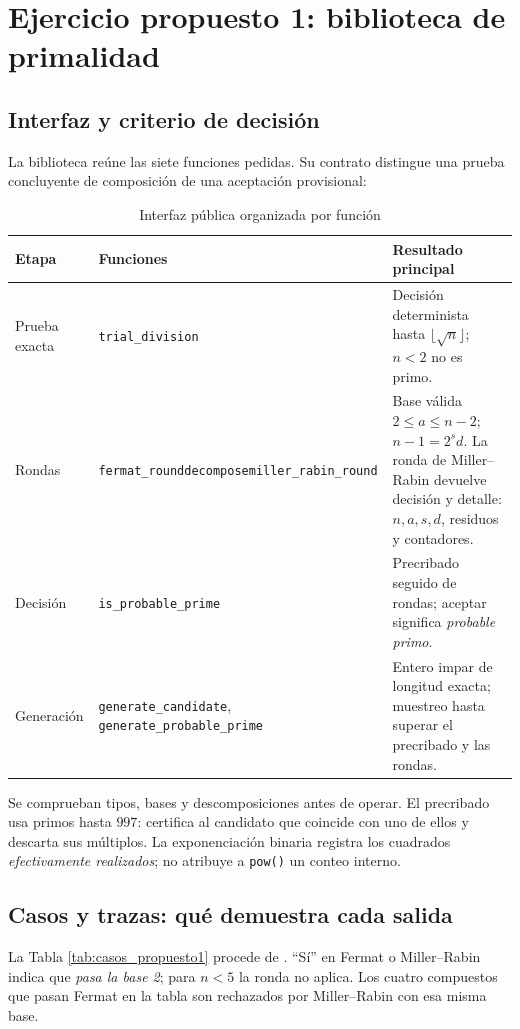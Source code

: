 \section{Ejercicio propuesto 1: biblioteca de primalidad}

\subsection{Interfaz y criterio de decisión}
La biblioteca  reúne las siete funciones pedidas. Su contrato distingue una prueba concluyente de composición de una aceptación provisional:
\begin{table}[H]\centering\small
\caption{Interfaz pública organizada por función}\label{tab:interfaz}
\begin{tabularx}{\textwidth}{@{}p{}>{\raggedright\arraybackslash}p{}X@{}}\toprule
Etapa & Funciones & Resultado principal \\ \midrule
Prueba exacta & \texttt{trial\_division} & Decisión determinista hasta $\lfloor\sqrt n\rfloor$; $n<2$ no es primo. \\
Rondas & \texttt{fermat\_round}\newline\texttt{decompose}\newline\texttt{miller\_rabin\_round} & Base válida $2\le a\le n-2$; $n-1=2^sd$. La ronda de Miller--Rabin devuelve decisión y detalle: $n,a,s,d$, residuos y contadores. \\
Decisión & \texttt{is\_probable\_prime} & Precribado seguido de rondas; aceptar significa \emph{probable primo}. \\
Generación & \texttt{generate\_candidate}, \texttt{generate\_probable\_prime} & Entero impar de longitud exacta; muestreo hasta superar el precribado y las rondas. \\ \bottomrule
\end{tabularx}\end{table}

Se comprueban tipos, bases y descomposiciones antes de operar. El precribado usa primos hasta $997$: certifica al candidato que coincide con uno de ellos y descarta sus múltiplos. La exponenciación binaria registra los cuadrados \emph{efectivamente realizados}; no atribuye a \texttt{pow()} un conteo interno.

\subsection{Casos y trazas: qué demuestra cada salida}
La Tabla \ref{tab:casos_propuesto1} procede de . ``Sí'' en Fermat o Miller--Rabin indica que \emph{pasa la base 2}; para $n<5$ la ronda no aplica. Los cuatro compuestos que pasan Fermat en la tabla son rechazados por Miller--Rabin con esa misma base.


